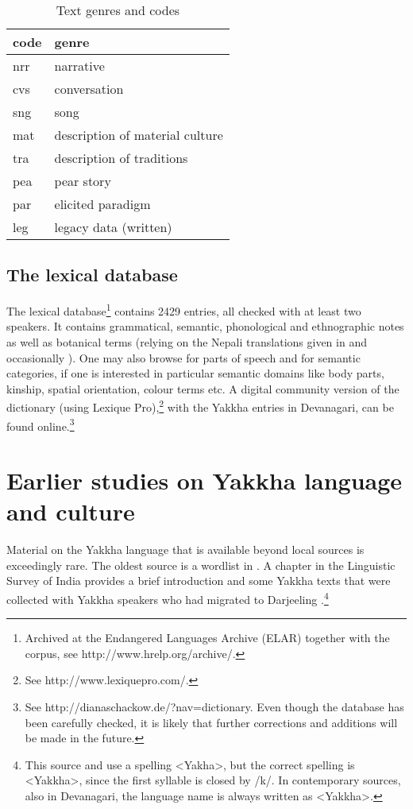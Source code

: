 \begin{table}[htp]
\begin{center}
\begin{tabular}{ll}
\toprule
{\sc code}&{\sc genre}\\
\midrule
nrr & narrative \\
cvs & conversation \\
sng & song\\
mat & description of material culture\\
tra & description of traditions\\
pea & pear story\\
par & elicited paradigm\\
leg & legacy data (written)\\
\bottomrule
\end{tabular}
\caption{Text genres and codes}\label{tab-genre}
\end{center}
\end{table}


\subsection{The lexical database}

The lexical database\footnote{Archived at the Endangered Languages Archive (ELAR) together with the corpus, see http://www.hrelp.org/archive/.} contains 2429 entries, all checked with at least two speakers. It contains grammatical, semantic, phonological and ethnographic notes as well as botanical terms (relying on the Nepali translations given in \citet{Manandhar2002_Plants} and occasionally \cite{Turner1931A-Comparative}). One may also browse for parts of speech and for semantic categories, if one is interested in particular semantic domains like body parts, kinship, spatial orientation, colour terms etc. A digital community version of the dictionary (using Lexique Pro),\footnote{See http://www.lexiquepro.com/.} with the Yakkha entries in Devanagari, can be found online.\footnote{See http://dianaschackow.de/?nav=dictionary. Even though the database has been carefully checked, it is likely that further corrections and additions will be made in the future.}


\section{Earlier studies on Yakkha language and culture}\label{earlier-work}


Material on the Yakkha language that is available beyond local sources is exceedingly rare. The oldest source is a wordlist in \citet{Hodgson1857_Comparative}. A chapter in the Linguistic Survey of India provides a brief introduction and some Yakkha texts that were collected with Yakkha speakers who had migrated to Darjeeling \citep[305-315]{Grierson1909Linguistic}.\footnote{This source and \citet{Russell1992_Yakha} use a spelling <Yakha>, but the correct spelling is <Yakkha>, since the first syllable is closed by /k/. In contemporary sources, also  in Devanagari, the language name is always written as <Yakkha>.} 

